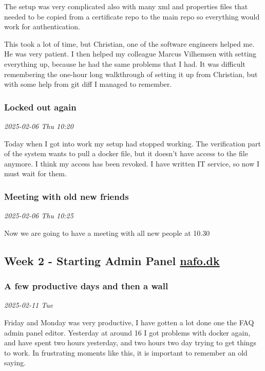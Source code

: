 \documentclass[../main.tex]{subfiles}
\begin{document}
The setup was very complicated also with many xml and properties files that needed to be copied from a certificate repo to the main repo so everything would work for authentication.

This took a lot of time, but Christian, one of the software engineers helped me. He was very patient. I then helped my colleague Marcus Vilhemsen with setting everything up, because he had the same problems that I had. It was difficult remembering the one-hour long walkthrough of setting it up from Christian, but with some help from git diff I managed to remember.

\subsubsection{Locked out again}

\noindent \textit{2025-02-06 Thu 10:20}

Today when I got into work my setup had stopped working. The verification part of the system wants to pull a docker file, but it doesn't have access to the file anymore. I think my access has been revoked. I have written IT service, so now I must wait for them.

\subsubsection{Meeting with old new friends}

\noindent \textit{2025-02-06 Thu 10:25}

Now we are going to have a meeting with all new people at 10.30 

\subsection{Week 2 - Starting Admin Panel \href{https://www.nationaltforsoegsoverblik.dk/}{nafo.dk}}
\subsubsection{A few productive days and then a wall}

\noindent \textit{2025-02-11 Tue}

Friday and Monday was very productive, I have gotten a lot done one the FAQ admin panel editor. Yesterday at around 16 I got problems with docker again, and have spent two hours yesterday, and two hours two day trying to get things to work. In frustrating moments like this, it is important to remember an old saying.
\end{document}
